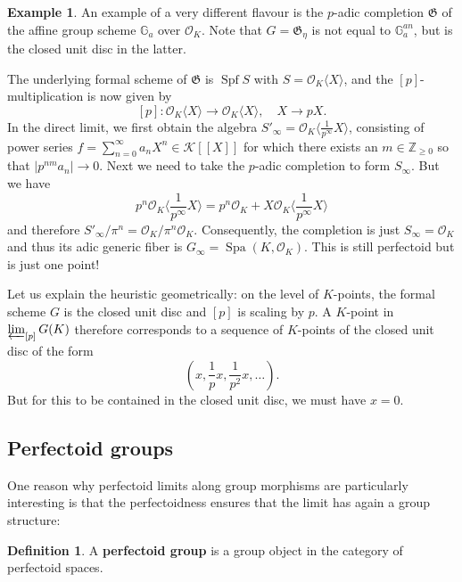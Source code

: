 \documentclass[10pt,oneside]{amsart}
\theoremstyle{definition}
\newtheorem{definition}[theorem]{Definition}
\newtheorem*{example}{Example}
\begin{document}
	
	\begin{example}
		An example of a very different flavour is  the $p$-adic completion  $\mathfrak G$  of the affine group scheme $\mathbb G_a$ over $\mathcal O_K$. Note that $G=\mathfrak G_\eta$ is not equal to $\mathbb G_a^{an}$, but is the closed unit disc in the latter.
		
		The underlying formal scheme of $\mathfrak G$ is $\operatorname {Spf} S$ with $S=\mathcal O_K\langle X \rangle$, and the $[p]$-multiplication is now given by
		\[[p]:\mathcal O_K\langle X \rangle\rightarrow  \mathcal O_K\langle X \rangle, \quad X\rightarrow pX.\]
		In the direct limit, we first obtain the algebra $S'_\infty  = \mathcal O_K\langle \frac{1}{p^\infty}X \rangle$, consisting of power series $f=\sum_{n=0}^\infty  a_nX^n\in \mathcal K[[X]]$ for which there exists an $m\in \mathbb Z_{\geq 0}$ so that $|p^{nm}a_n|\to 0$. Next we need to take the $p$-adic completion to form $S_\infty$. But we have 
		\[p^n\mathcal O_K\langle \frac{1}{p^\infty}X \rangle = p^n\mathcal O_K + X \mathcal O_K\langle \frac{1}{p^\infty}X \rangle\]
		and therefore $S'_\infty/\pi^n=\mathcal O_K/\pi^n\mathcal O_K$. Consequently, the completion is just $S_\infty = \mathcal O_K$ and thus its adic generic fiber is $G_\infty = \operatorname{Spa}(K,\mathcal O_K)$.  This is still perfectoid but is just one point!
		
		Let us explain the heuristic geometrically: on the level of $K$-points, the formal scheme $G$ is the closed unit disc and $[p]$ is scaling by $p$. A $K$-point in $\varprojlim_{[p]} G(K)$ therefore corresponds to a sequence of $K$-points of the closed unit disc of the form 
		$$ (x,\frac{1}{p}x,\frac{1}{p^2}x,\dots ).$$ But for this to be contained in the closed unit disc, we must have $x=0$. 
		
	\end{example}
	
 
 
	
 
	
		
	\subsection{Perfectoid groups}
	
	One reason why perfectoid limits along group morphisms are particularly interesting is that the perfectoidness ensures that the limit has again a group structure:
	
	\begin{definition}
		A \textbf{perfectoid group} is a group object in the category of perfectoid spaces.
	\end{definition}
	
\end{document}
